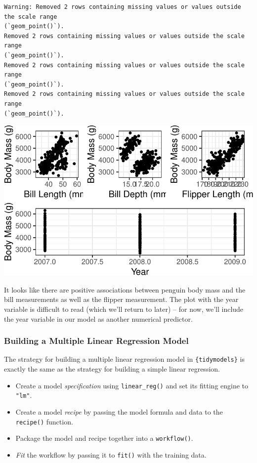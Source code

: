\documentclass[
  letterpaper,
  DIV=11,
  numbers=noendperiod]{scrartcl}
\providecommand{\tightlist}{%
  \setlength{\itemsep}{0pt}\setlength{\parskip}{0pt}}\usepackage{longtable,booktabs,array}
\begin{document}
\begin{verbatim}
Warning: Removed 2 rows containing missing values or values outside the scale range
(`geom_point()`).
Removed 2 rows containing missing values or values outside the scale range
(`geom_point()`).
Removed 2 rows containing missing values or values outside the scale range
(`geom_point()`).
Removed 2 rows containing missing values or values outside the scale range
(`geom_point()`).
\end{verbatim}

\includegraphics{10d_MultipleLinearRegression_files/figure-pdf/unnamed-chunk-3-1.pdf}

It looks like there are positive associations between penguin body mass
and the bill measurements as well as the flipper measurement. The plot
with the year variable is difficult to read (which we'll return to
later) -- for now, we'll include the year variable in our model as
another numerical predictor.

\subsubsection{Building a Multiple Linear Regression
Model}\label{building-a-multiple-linear-regression-model}

The strategy for building a multiple linear regression model in
\texttt{\{tidymodels\}} is exactly the same as the strategy for building
a simple linear regression.

\begin{itemize}
\tightlist
\item
  Create a model \emph{specification} using \texttt{linear\_reg()} and
  set its fitting engine to \texttt{"lm"}.
\item
  Create a model \emph{recipe} by passing the model formula and data to
  the \texttt{recipe()} function.
\item
  Package the model and recipe together into a \texttt{workflow()}.
\item
  \emph{Fit} the workflow by passing it to \texttt{fit()} with the
  training data.
\end{itemize}
\end{document}
